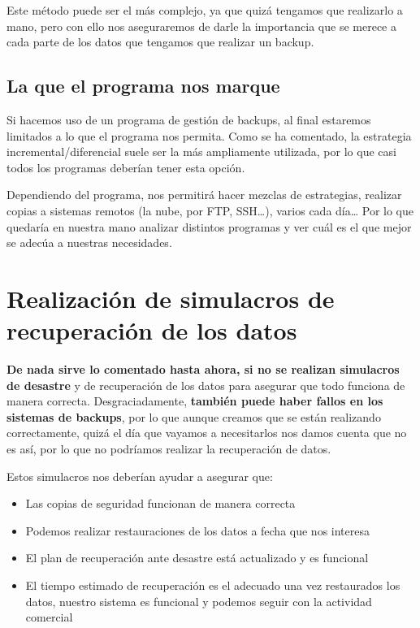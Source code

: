 Este método puede ser el más complejo, ya que quizá tengamos que realizarlo a mano, pero con ello nos aseguraremos de darle la importancia que se merece a cada parte de los datos que tengamos que realizar un backup.

\subsection{La que el programa nos marque}
Si hacemos uso de un programa de gestión de backups, al final estaremos limitados a lo que el programa nos permita. Como se ha comentado, la estrategia incremental/diferencial suele ser la más ampliamente utilizada, por lo que casi todos los programas deberían tener esta opción.

Dependiendo del programa, nos permitirá hacer mezclas de estrategias, realizar copias a sistemas remotos (la nube, por FTP, SSH…), varios cada día… Por lo que quedaría en nuestra mano analizar distintos programas y ver cuál es el que mejor se adecúa a nuestras necesidades.

\section{Realización de simulacros de recuperación de los datos}
\textbf{De nada sirve lo comentado hasta ahora, si no se realizan simulacros de desastre} y de recuperación de los datos para asegurar que todo funciona de manera correcta. Desgraciadamente, \textbf{también puede haber fallos en los sistemas de backups}, por lo que aunque creamos que se están realizando correctamente, quizá el día que vayamos a necesitarlos nos damos cuenta que no es así, por lo que no podríamos realizar la recuperación de datos.


Estos simulacros nos deberían ayudar a asegurar que:

\begin{itemize}
    \item Las copias de seguridad funcionan de manera correcta
    \item Podemos realizar restauraciones de los datos a fecha que nos interesa
    \item El plan de recuperación ante desastre está actualizado y es funcional
    \item El tiempo estimado de recuperación es el adecuado
    una vez restaurados los datos, nuestro sistema es funcional y podemos seguir con la actividad comercial
\end{itemize}




\clearpage